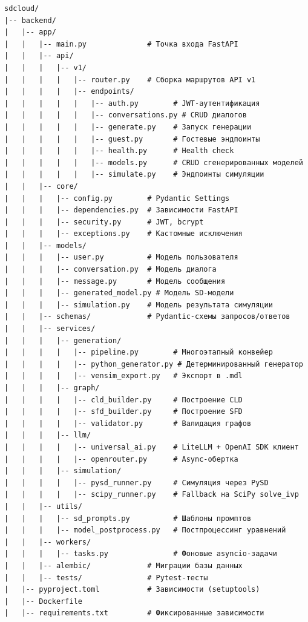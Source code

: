 \begin{lstlisting}[caption={Структура директорий проекта sdCloud (актуальная версия)}, label={lst:project-tree}, language={}, basicstyle=\ttfamily\scriptsize]
sdcloud/
|-- backend/
|   |-- app/
|   |   |-- main.py              # Точка входа FastAPI
|   |   |-- api/
|   |   |   |-- v1/
|   |   |   |   |-- router.py    # Сборка маршрутов API v1
|   |   |   |   |-- endpoints/
|   |   |   |   |   |-- auth.py        # JWT-аутентификация
|   |   |   |   |   |-- conversations.py # CRUD диалогов
|   |   |   |   |   |-- generate.py    # Запуск генерации
|   |   |   |   |   |-- guest.py       # Гостевые эндпоинты
|   |   |   |   |   |-- health.py      # Health check
|   |   |   |   |   |-- models.py      # CRUD сгенерированных моделей
|   |   |   |   |   |-- simulate.py    # Эндпоинты симуляции
|   |   |-- core/
|   |   |   |-- config.py        # Pydantic Settings
|   |   |   |-- dependencies.py  # Зависимости FastAPI
|   |   |   |-- security.py      # JWT, bcrypt
|   |   |   |-- exceptions.py    # Кастомные исключения
|   |   |-- models/
|   |   |   |-- user.py          # Модель пользователя
|   |   |   |-- conversation.py  # Модель диалога
|   |   |   |-- message.py       # Модель сообщения
|   |   |   |-- generated_model.py # Модель SD-модели
|   |   |   |-- simulation.py    # Модель результата симуляции
|   |   |-- schemas/             # Pydantic-схемы запросов/ответов
|   |   |-- services/
|   |   |   |-- generation/
|   |   |   |   |-- pipeline.py        # Многоэтапный конвейер
|   |   |   |   |-- python_generator.py # Детерминированный генератор
|   |   |   |   |-- vensim_export.py   # Экспорт в .mdl
|   |   |   |-- graph/
|   |   |   |   |-- cld_builder.py     # Построение CLD
|   |   |   |   |-- sfd_builder.py     # Построение SFD
|   |   |   |   |-- validator.py       # Валидация графов
|   |   |   |-- llm/
|   |   |   |   |-- universal_ai.py    # LiteLLM + OpenAI SDK клиент
|   |   |   |   |-- openrouter.py      # Async-обертка
|   |   |   |-- simulation/
|   |   |   |   |-- pysd_runner.py     # Симуляция через PySD
|   |   |   |   |-- scipy_runner.py    # Fallback на SciPy solve_ivp
|   |   |-- utils/
|   |   |   |-- sd_prompts.py          # Шаблоны промптов
|   |   |   |-- model_postprocess.py   # Постпроцессинг уравнений
|   |   |-- workers/
|   |   |   |-- tasks.py               # Фоновые asyncio-задачи
|   |   |-- alembic/             # Миграции базы данных
|   |   |-- tests/               # Pytest-тесты
|   |-- pyproject.toml           # Зависимости (setuptools)
|   |-- Dockerfile
|   |-- requirements.txt         # Фиксированные зависимости

\end{lstlisting}
